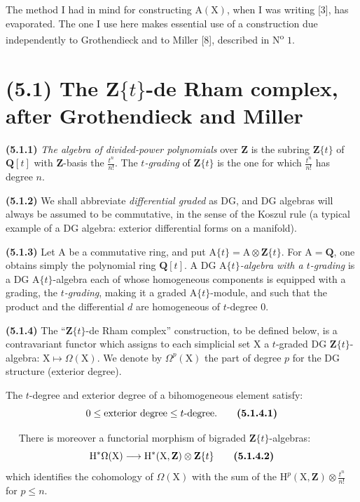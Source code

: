 \documentclass[11pt,leqno]{article}
\newcommand{\Page}[1]{\ifvmode\noindent\else\unskip\ \fi{\footnotesize\textcolor{gray}{[p.\,#1]}}\ \ignorespaces}
\begin{document}
The method I had in mind for constructing \(\mathrm{A}(\mathrm{X})\), when I was writing [3], has evaporated. The one I use here makes essential use of a construction due independently to Grothendieck and to Miller [8], described in N\textsuperscript{o} \(1\).

\section*{(5.1) The \(\mathbf{Z}\{t\}\)-de Rham complex, after Grothendieck and Miller}

\textbf{(5.1.1)} \textit{The algebra of divided-power polynomials} over \(\mathbf{Z}\) is the subring \(\mathbf{Z}\{t\}\) of \(\mathbf{Q}[t]\) with \(\mathbf{Z}\)-basis the \(\frac{t^n}{n!}\). The \textit{\(t\)-grading} of \(\mathbf{Z}\{t\}\) is the one for which \(\frac{t^n}{n!}\) has degree \(n\).

\textbf{(5.1.2)} We shall abbreviate \textit{differential graded} as DG, and DG algebras will always be assumed to be commutative, in the sense of the Koszul rule (a typical example of a DG algebra: exterior differential forms on a manifold).

\textbf{(5.1.3)} Let \(\mathrm{A}\) be a commutative ring, and put \(\mathrm{A}\{t\}=\mathrm{A}\otimes\mathbf{Z}\{t\}\). For \(\mathrm{A}=\mathbf{Q}\), one obtains simply the polynomial ring \(\mathbf{Q}[t]\). A DG \(\mathrm{A}\{t\}\)\textit{-algebra with a \(t\)-grading} is a DG \(\mathrm{A}\{t\}\)-algebra each of whose homogeneous components is equipped with a grading, the \textit{\(t\)-grading}, making it a graded \(\mathrm{A}\{t\}\)-module, and such that the product and the differential \(d\) are homogeneous of \(t\)-degree \(0\).

\textbf{(5.1.4)} The “\(\mathbf{Z}\{t\}\)-de Rham complex” construction, to be defined below, is a contravariant functor which assigns to each simplicial set \(\mathrm{X}\) a \(t\)-graded DG \(\mathbf{Z}\{t\}\)-algebra: \(\mathrm{X}\mapsto\Omega(\mathrm{X})\). We denote by \(\Omega^p(\mathrm{X})\) the part of degree \(p\) for the DG structure (exterior degree).

The \(t\)-degree and exterior degree of a bihomogeneous element satisfy:
\[
0\leq\text{exterior degree}\leq t\text{-degree}.
\tag*{\textbf{(5.1.4.1)}}
\]

\Page{235}
There is moreover a functorial morphism of bigraded \(\mathbf{Z}\{t\}\)-algebras:
\[
\mathrm{H}^*\Omega(\mathrm{X})
\longrightarrow
\mathrm{H}^*(\mathrm{X},\mathbf{Z})\otimes\mathbf{Z}\{t\}
\tag*{\textbf{(5.1.4.2)}}
\]
which identifies the cohomology of \(\Omega(\mathrm{X})\) with the sum of the \(\mathrm{H}^p(\mathrm{X},\mathbf{Z})\otimes\frac{t^n}{n!}\) for \(p\leq n\).
\end{document}
